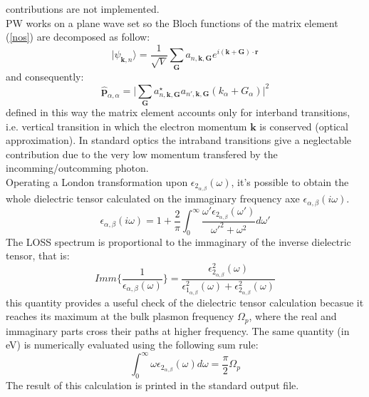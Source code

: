 \documentclass[twocolumn]{article}
\begin{document}
contributions are not implemented.\\
PW works on a plane wave set so the Bloch functions of the matrix element (\ref{nos}) are decomposed as follow:
\begin{equation}
\vert \psi_{\textbf{k},n}\rangle=\frac{1}{\sqrt{V}}\sum_{\textbf{G}}a_{n,\textbf{k},\textbf{G}}
e^{i(\textbf{k}+\textbf{G})\cdot\textbf{r}}
\end{equation}
and consequently:
\begin{equation}
\hat{\textbf{p}}_{\alpha,\alpha}=\vert\sum_{\textbf{G}}a^{\star}_{n,\textbf{k},\textbf{G}}a_{n',\textbf{k},\textbf{G}}
(k_{\alpha}+G_{\alpha})\vert^{2}
\end{equation}
defined in this way the matrix element accounts only for interband transitions, i.e. vertical transition in which the 
electron momentum $\textbf{k}$ is conserved (optical approximation). In standard optics the intraband transitions give a 
neglectable contribution due to the very low momentum transfered by the incomming/outcomming photon.\\
Operating a London transformation upon $\epsilon_{2_{\alpha,\beta}}(\omega)$, it's possible to obtain the whole dielectric
tensor calculated on the immaginary frequency axe $\epsilon_{\alpha,\beta}(i\omega)$. 
\begin{equation}
\epsilon_{\alpha,\beta}(i\omega)=1+\frac{2}{\pi}\int_{0}^{\infty}\frac{\omega' \epsilon_{2_{\alpha,\beta}}(\omega')}
{\omega'^{2}+\omega^{2}}d\omega'
\end{equation}
The LOSS spectrum is proportional to the immaginary of the inverse dielectric tensor, that is:
\begin{equation}
Imm\Bigg\{\frac{1}{\epsilon_{\alpha,\beta}(\omega)}\Bigg\}=
\frac{\epsilon_{2_{\alpha,\beta}}^{2}(\omega)}{\epsilon_{1_{\alpha,\beta}}^{2}(\omega)+
\epsilon_{2_{\alpha,\beta}}^{2}(\omega)}
\end{equation}
this quantity provides a useful check of the dielectric tensor calculation becasue it reaches its maximum at the bulk plasmon
frequency $\Omega_{p}$, where the real and immaginary parts cross their paths at higher frequency. The same quantity (in eV)
is numerically evaluated using the following sum rule:
\begin{equation}
\int_{0}^{\infty}\omega\epsilon_{2_{\alpha,\beta}}(\omega)d\omega=\frac{\pi}{2}\Omega_{p}
\end{equation}  
The result of this calculation is printed in the standard output file.
\end{document}
